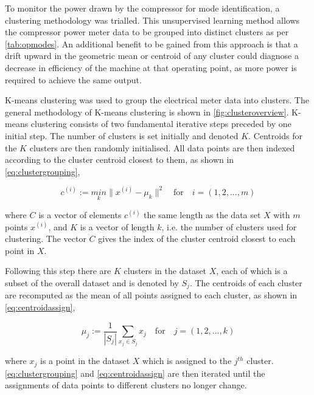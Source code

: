 To monitor the power drawn by the compressor for mode identification, a clustering methodology was trialled. This unsupervised learning method allows the compressor power meter data to be grouped into distinct clusters as per \autoref{tab:opmodes}. An additional benefit to be gained from this approach is that a drift upward in the geometric mean or centroid of any cluster could diagnose a decrease in efficiency of the machine at that operating point, as more power is required to achieve the same output.

K-means clustering was used to group the electrical meter data into clusters. The general methodology of K-means clustering is shown in \autoref{fig:clusteroverview}. K-means clustering consists of two fundamental iterative steps preceded by one initial step. The number of clusters is set initially and denoted $K$. Centroids for the $K$ clusters are then randomly initialised. All data points are then indexed according to the cluster centroid closest to them, as shown in \autoref{eq:clustergrouping},

\begin{equation}
c^{(i)}  := \underset{k}{min}  \lVert {x^{(i)} - \mu_k} \rVert ^2 \quad \text{for} \quad i = (1, 2, ..., m)
\label{eq:clustergrouping}
\end{equation}

where $C$ is a vector of elements $c^{(i)}$ the same length as the data set $X$ with $m$ points $x^{(i)}$, and $K$ is a vector of length $k$, i.e. the number of clusters used for clustering. The vector $C$ gives the index of the cluster centroid closest to each point in $X$.

Following this step there are $K$ clusters in the dataset $X$, each of which is a subset of the overall dataset and is denoted by $S_j$. The centroids of each cluster are recomputed as the mean of all points assigned to each cluster, as shown in \autoref{eq:centroidassign},

\begin{equation}
\mu_j := \frac{1}{|S_j|}\sum_{x_j \in S_j} x_j \quad \text{for} \quad j = (1, 2, ..., k)
\label{eq:centroidassign}
\end{equation}

where $x_j$ is a point in the dataset $X$ which is assigned to the $j^{th}$ cluster. \autoref{eq:clustergrouping} and \autoref{eq:centroidassign} are then iterated until the assignments of data points to different clusters no longer change.

